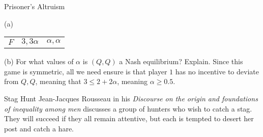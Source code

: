 \documentclass[10pt]{extarticle}
\begin{document}
\begin{problem}{Prisoner's Altruism}
\begin{problem}{(a)}
\begin{center}
\begin{tabular}{c|c|c|}
          \cline{2-3}
          $F$ & $3,3\alpha$ & $\alpha,\alpha$\\
          \cline{2-3}
        \end{tabular}
      \end{center}
    \end{problem}
    \begin{problem}{(b)}
      For what values of $\alpha$ is $(Q,Q)$ a Nash equilibrium? Explain.
      \tcblower
      Since this game is symmetric, all we need ensure is that player $1$ has no incentive to deviate from $Q,Q$, meaning that $3 \leq 2+2\alpha$, meaning $\alpha \geq 0.5$.
    \end{problem}
  \end{problem}
  \begin{problem}{Stag Hunt}
    Jean-Jacques Rousseau in his \textit{Discourse on the origin and foundations of inequality among men} discusses a group of hunters who wish to catch a stag. They will succeed if they all remain attentive, but each is tempted to desert her post and catch a hare.\\


\end{problem}
\end{document}
